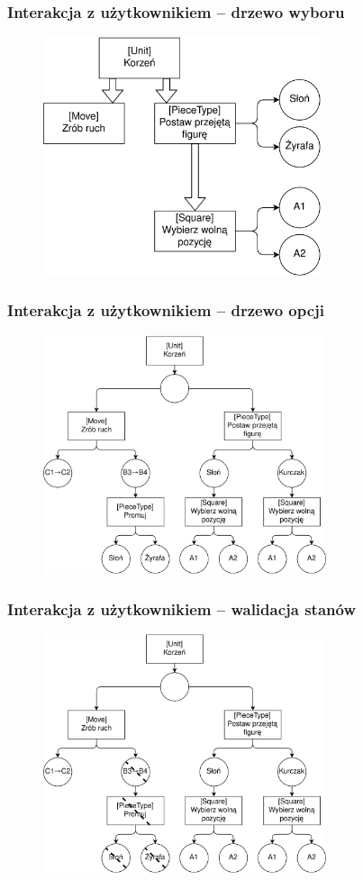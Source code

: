 \documentclass{beamer}
\begin{document}
\begin{frame}
	\frametitle{Interakcja z użytkownikiem -- drzewo wyboru}
	\begin{figure}
		\includegraphics[height=7cm]{img/mess-choice-diagram.jpg}
		\centering
	\end{figure}
\end{frame}

\begin{frame}[noframenumbering]
	\frametitle{Interakcja z użytkownikiem -- drzewo opcji}
	\begin{figure}
		\includegraphics[height=7cm]{img/mess-option-diagram.jpg}
		\centering
	\end{figure}
\end{frame}

\begin{frame}[noframenumbering]
	\frametitle{Interakcja z użytkownikiem -- walidacja stanów}
	\begin{figure}
		\includegraphics[height=7cm]{img/mess-validator-diagram.jpg}
		\centering
	\end{figure}
\end{frame}
\end{document}
